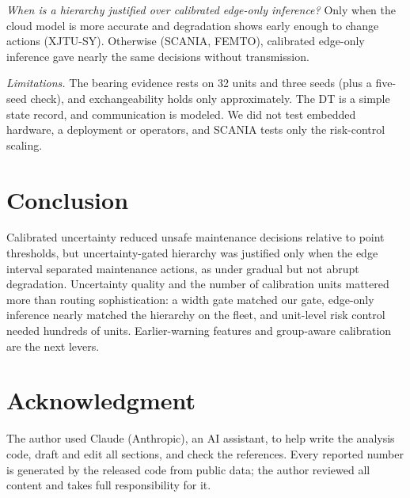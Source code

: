 \documentclass[conference]{IEEEtran}
\begin{document}
\textit{When is a hierarchy justified over calibrated edge-only inference?} Only when the cloud model is more accurate and degradation shows early enough to change actions (XJTU-SY). Otherwise (SCANIA, FEMTO), calibrated edge-only inference gave nearly the same decisions without transmission.

\textit{Limitations.} The bearing evidence rests on 32 units and three seeds (plus a five-seed check), and exchangeability holds only approximately. The DT is a simple state record, and communication is modeled. We did not test embedded hardware, a deployment or operators, and SCANIA tests only the risk-control scaling.

\section{Conclusion}
Calibrated uncertainty reduced unsafe maintenance decisions relative to point thresholds, but uncertainty-gated hierarchy was justified only when the edge interval separated maintenance actions, as under gradual but not abrupt degradation. Uncertainty quality and the number of calibration units mattered more than routing sophistication: a width gate matched our gate, edge-only inference nearly matched the hierarchy on the fleet, and unit-level risk control needed hundreds of units. Earlier-warning features and group-aware calibration are the next levers.

\section*{Acknowledgment}
The author used Claude (Anthropic), an AI assistant, to help write the analysis code, draft and edit all sections, and check the references. Every reported number is generated by the released code from public data; the author reviewed all content and takes full responsibility for it.



\end{document}
